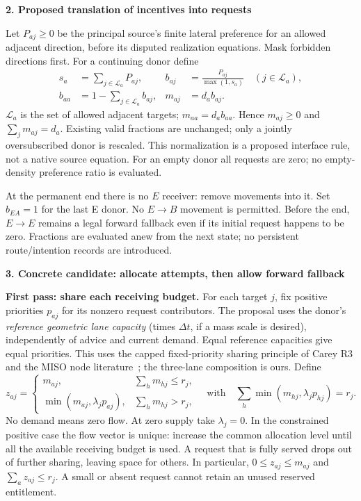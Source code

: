 \documentclass[10pt,a4paper]{article}
\newcommand{\head}[1]{\par\medskip\textbf{#1}\par}
\newcommand{\Try}{\mathcal L}
\begin{document}
\head{2. Proposed translation of incentives into requests}
Let $P_{aj}\geq0$ be the principal source's finite lateral preference for an
allowed adjacent direction, before its disputed realization equations.
Mask forbidden directions first. For a continuing donor define
\begin{align}
 s_a&=\sum_{j\in\Try_a}P_{aj}, &
 b_{aj}&=\frac{P_{aj}}{\max(1,s_a)}\quad(j\in\Try_a),\nonumber\\
 b_{aa}&=1-\sum_{j\in\Try_a}b_{aj}, & m_{aj}&=d_a b_{aj}. \label{eq:requests}
\end{align}
$\Try_a$ is the set of allowed adjacent targets; $m_{aa}=d_ab_{aa}$.
Hence $m_{aj}\geq0$ and $\sum_jm_{aj}=d_a$. Existing valid fractions are
unchanged; only a jointly oversubscribed donor is rescaled. This normalization
is a proposed interface rule, not a native source equation. For an empty
donor all requests are zero; no empty-density preference ratio is evaluated.

At the permanent end there is no $E$ receiver: remove movements into it.
Set $b_{EA}=1$ for the last E donor. No $E\to B$ movement is permitted.
Before the end, $E\to E$ remains a legal forward fallback even if its initial
request happens to be zero. Fractions are evaluated anew from the next state;
no persistent route/intention records are introduced.

\newpage
\head{3. Concrete candidate: allocate attempts, then allow forward fallback}
\textbf{First pass: share each receiving budget.}
For each target $j$, fix positive priorities $p_{aj}$ for its nonzero request
contributors. The proposal uses the donor's \emph{reference geometric lane
capacity} (times $\Delta t$, if a mass scale is desired), independently of
advice and current demand. Equal reference capacities give equal priorities.
This uses the capped fixed-priority sharing principle of Carey R3 and the
MISO node literature~\cite{carey,wright}; the three-lane composition is ours.
Define
\begin{equation}
 z_{aj}=\begin{cases}
 m_{aj},& \sum_h m_{hj}\leq r_j,\\
 \min(m_{aj},\lambda_jp_{aj}),&\sum_h m_{hj}>r_j,
 \end{cases}
 \quad\text{with}\quad
 \sum_h\min(m_{hj},\lambda_jp_{hj})=r_j. \label{eq:share}
\end{equation}
No demand means zero flow. At zero supply take $\lambda_j=0$. In the
constrained positive case the flow vector is unique: increase the common
allocation level until all the available receiving budget is used. A request
that is fully served drops out of further sharing, leaving space for others.
In particular, $0\leq z_{aj}\leq m_{aj}$ and
$\sum_a z_{aj}\leq r_j$. A small or absent request cannot retain an unused
reserved entitlement.
\end{document}
